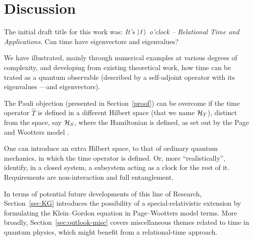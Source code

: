 \section{Discussion}

The initial draft title for this work was: 
\textit{It's $\it\ket{1}$ o'clock -- Relational Time and Applications}.
Can time have eigenvectors and eigenvalues?

We have illustrated,
mainly through numerical examples
at various degrees of complexity,
and developing from existing theoretical work,
how time can be trated as a quantum observable
(described by a self-adjoint operator with its eigenvalues ---and eigenvectors).

The Pauli objection (presented in Section~\ref{proof})
can be overcome if the time operator $\hat{T}$
is defined in a different Hilbert space (that we name $\mathcal{H}_T$),
distinct from
the space, say $\mathcal{H}_S$, where the Hamiltonian is defined,
as set out by the Page and Wootters model
\parencite{PageWootters, Lloyd:Time, Marletto:Evolution, Maccone:QMOT, Maccone:Pauli}.

One can introduce an extra Hilbert space, to that of ordinary quantum mechanics,
in which the time operator is defined.
Or, more ``realistically'', identify, in a closed system, a subsystem
acting as a clock for the rest of it. Requirements are non-interaction and
full entanglement.

In terms of potential future developments of this line of Research,
Section~\ref{sec:KG} introduces the possibility of a special-relativistic extension
by formulating the Klein--Gordon equation in Page--Wootters model terms.
More broadly, Section~\ref{sec:outlook-misc} covers miscellaneous themes
related to time in quantum physics,
which might
benefit from a relational-time approach.



